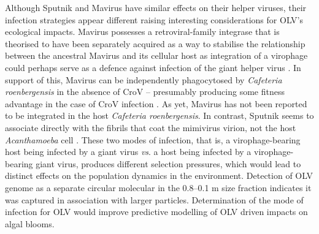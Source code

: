 Although Sputnik and Mavirus have similar effects on their helper viruses, their infection strategies appear different raising interesting considerations for \ac{OLV}'s ecological impacts.
Mavirus possesses a retroviral-family integrase that is theorised to have been separately acquired as a way to stabilise the relationship between the ancestral Mavirus and its cellular host as integration of a virophage could perhaps serve as a defence against infection of the giant helper virus \cite{Fischer2011a}.
In support of this, Mavirus can be independently phagocytosed by \emph{Cafeteria roenbergensis} in the absence of \ac{CroV} -- presumably producing some fitness advantage in the case of \ac{CroV} infection \cite{Fischer2011a}.
As yet, Mavirus has not been reported to be integrated in the host \emph{Cafeteria roenbergensis}.
In contrast, Sputnik seems to associate directly with the fibrils that coat the mimivirus virion, not the host \emph{Acanthamoeba} cell \cite{Boyer2011}.
These two modes of infection, that is, a virophage-bearing host being infected by a giant virus \emph{vs}. a host being infected by a virophage-bearing giant virus, produces different selection pressures, which would lead to distinct effects on the population dynamics in the environment.
Detection of \ac{OLV} genome as a separate circular molecular in the 0.8--0.1 \textmu{}m size fraction indicates it was captured in association with larger particles.
Determination of the mode of infection for \ac{OLV} would improve predictive modelling of \ac{OLV} driven impacts on algal blooms.


